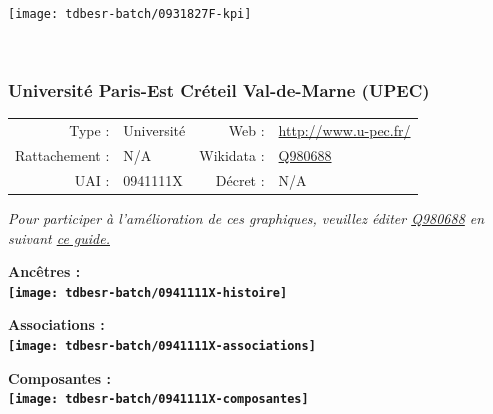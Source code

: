 \documentclass[12pt,french,]{article}
\begin{document}
\begin{center}\texttt{[image: tdbesr-batch/0931827F-kpi]} \end{center}\checkoddpage

\ifoddpage ~\newpage \fi   

\hypertarget{universituxe9-paris-est-cruxe9teil-val-de-marne-upec}{%
\subsubsection{Université Paris-Est Créteil Val-de-Marne
(UPEC)}\label{universituxe9-paris-est-cruxe9teil-val-de-marne-upec}}

\begin{tabular*}{\textwidth}{rp{5cm}rl}  
\hline  
Type : & Université & Web : &\href{http://www.u-pec.fr/}{http://www.u-pec.fr/} \\  
Rattachement : & N/A & Wikidata : & \href{https://www.wikidata.org/entity/Q980688}{Q980688} \\  
UAI : & 0941111X & Décret : & N/A \\  
\hline  
\end{tabular*}

\textit{\scriptsize Pour participer à l'amélioration de ces graphiques, veuillez éditer  \href{https://www.wikidata.org/entity/Q980688}{Q980688}  en suivant \href{https://github.com/cpesr/wikidataESR/blob/master/Rmd/wikidataESR.md}{ce guide.}}

\vspace{1cm}  
\begin{minipage}[b]{0.50\textwidth}\begin{center} \bf Ancêtres : \\  
\texttt{[image: tdbesr-batch/0941111X-histoire]} \end{center}\end{minipage}\begin{minipage}[b]{0.50\textwidth}\begin{center} \bf Associations : \\  
\texttt{[image: tdbesr-batch/0941111X-associations]} \end{center}\end{minipage}

\hrulefill

\begin{center} \bf Composantes : \\  
\texttt{[image: tdbesr-batch/0941111X-composantes]} \end{center}
\end{document}
